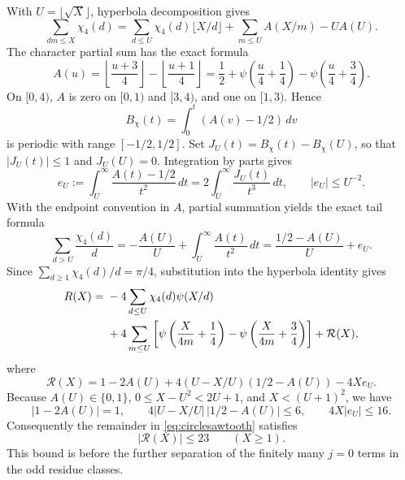 \documentclass[11pt,reqno]{amsart}
\numberwithin{equation}{section}
\theoremstyle{definition}
\theoremstyle{remark}
\begin{document}
With $U=\lfloor\sqrt X\rfloor$, hyperbola decomposition gives
\begin{equation}\label{eq:characterhyperbola}
 \sum_{dm\le X}\chi_4(d)
 =\sum_{d\le U}\chi_4(d)\lfloor X/d\rfloor
  +\sum_{m\le U}A(X/m)-UA(U).
\end{equation}
The character partial sum has the exact formula
\begin{equation}\label{eq:Aformula}
 A(u)=\left\lfloor\frac{u+3}{4}\right\rfloor
     -\left\lfloor\frac{u+1}{4}\right\rfloor
 =\frac12+\psi\left(\frac u4+\frac14\right)
          -\psi\left(\frac u4+\frac34\right).
\end{equation}
On $[0,4)$, $A$ is zero on $[0,1)$ and $[3,4)$, and one on $[1,3)$. Hence
\[
 B_\chi(t)=\int_0^t(A(v)-1/2)\,dv
\]
is periodic with range $[-1/2,1/2]$. Set $J_U(t)=B_\chi(t)-B_\chi(U)$, so that $|J_U(t)|\le1$ and $J_U(U)=0$.
Integration by parts gives
\begin{equation}\label{eq:charintegral}
 e_U:=\int_U^\infty\frac{A(t)-1/2}{t^2}\,dt
 =2\int_U^\infty\frac{J_U(t)}{t^3}\,dt,
 \qquad |e_U|\le U^{-2}.
\end{equation}
With the endpoint convention in $A$, partial summation yields the exact tail formula
\begin{equation}\label{eq:chartail}
 \sum_{d>U}\frac{\chi_4(d)}d
 =-\frac{A(U)}U+\int_U^\infty\frac{A(t)}{t^2}\,dt
 =\frac{1/2-A(U)}U+e_U.
\end{equation}
Since $\sum_{d\ge1}\chi_4(d)/d=\pi/4$, substitution into the hyperbola identity gives
\begin{align}
 R(X)={}&-4\sum_{d\le U}\chi_4(d)\psi(X/d)\notag\\
 &+4\sum_{m\le U}\left[
 \psi\left(\frac X{4m}+\frac14\right)
 -\psi\left(\frac X{4m}+\frac34\right)\right]
 +\mathcal R(X),\label{eq:circlesawtooth}
\end{align}
where
\begin{equation}\label{eq:circleremainder}
 \mathcal R(X)=1-2A(U)+4(U-X/U)(1/2-A(U))-4Xe_U.
\end{equation}
Because $A(U)\in\{0,1\}$, $0\le X-U^2<2U+1$, and $X<(U+1)^2$, we have
\[
 |1-2A(U)|=1,\qquad
 4|U-X/U|\,|1/2-A(U)|\le6,\qquad
 4X|e_U|\le16.
\]
Consequently the remainder in \eqref{eq:circlesawtooth} satisfies
\begin{equation}\label{eq:23}
 |\mathcal R(X)|\le23\qquad(X\ge1).
\end{equation}
This bound is before the further separation of the finitely many $j=0$ terms in the odd residue classes.
\end{document}
